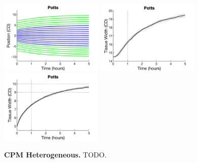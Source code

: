 \documentclass[12pt]{article}
\begin{document}
\begin{figure}[h!]
%
\begin{center}
\includegraphics[width=4.9cm, trim={0.0cm 0.0cm 0.0cm 0.0cm}, clip]{Figs/Test02aMonolayerGrowth1dChainHeterogeneousChainPotts.png}
\includegraphics[width=4.9cm, trim={0.0cm 0.0cm 0.0cm 0.0cm}, clip]{Figs/Test02aMonolayerGrowth1dChainHeterogeneousChainPottsWidth}
\includegraphics[width=4.9cm, trim={0.0cm 0.0cm 0.0cm 0.0cm}, clip]{Figs/Test02aMonolayerGrowth1dChainHeterogeneousChainPottsInnerWidth}
\end{center}
\vspace{-0.5cm}
\caption{{\bf CPM Heterogeneous.} 
	TODO. }
\label{fig:todo}
\end{figure}
\end{document}
